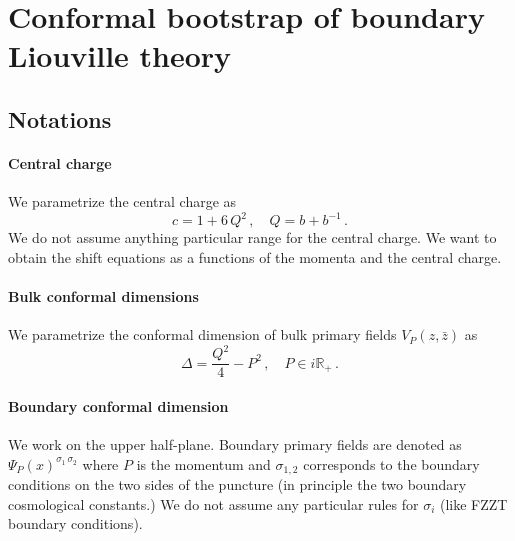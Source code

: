 \documentclass[a4paper]{article}
\begin{document}
\section{Conformal bootstrap of boundary Liouville theory}
\subsection{Notations}
\paragraph{Central charge} We parametrize the central charge as
\begin{equation}
    c=1+6\,Q^2\,, \quad Q=b+b^{-1}\,.
\end{equation}
We do not assume anything particular range for the central charge. We want to obtain the shift equations as a functions of the momenta and the central charge.
\paragraph{Bulk conformal dimensions} We parametrize the conformal dimension of bulk primary fields $V_{P}(z,\bar{z})$ as 
\begin{equation}
  \Delta = \frac{Q^2}{4} - P^2\,, \quad P\in i \mathbb{R}_+\,.
\end{equation}

\paragraph{Boundary conformal dimension} We work on the upper half-plane. Boundary primary fields are denoted as $\Psi_{P}(x)^{\sigma_1\,\sigma_2}$ where $P$ is the momentum and $\sigma_{1,2}$ corresponds to the boundary conditions on the two sides of the puncture (in principle the two boundary cosmological constants.) We do not assume any particular rules for $\sigma_{i}$ (like FZZT boundary conditions).
\end{document}
